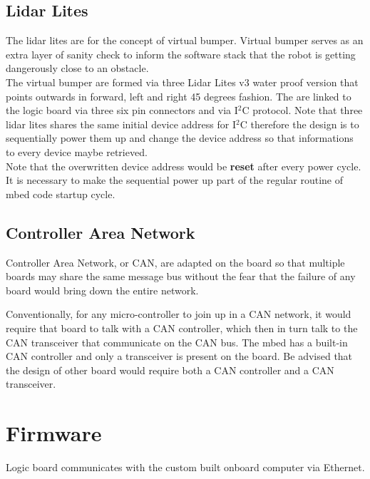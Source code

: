 \documentclass[letterpaper, 12pt]{article}
\begin{document}
\subsection{Lidar Lites}

The lidar lites are for the concept of virtual bumper. Virtual bumper serves as an extra layer of sanity check to inform
the software stack that the robot is getting dangerously close to an obstacle. \\

The virtual bumper are formed via three Lidar Lites v3 water proof version that points outwards in forward, left and right 45 degrees fashion.
The are linked to the logic board via three six pin connectors and via I$^2$C protocol. Note that three lidar lites shares the same initial 
device address for I$^2$C therefore the design is to sequentially power them up and change the device address so that informations to every device
maybe retrieved. \\

Note that the overwritten device address would be \textbf{reset} after every power cycle. It is necessary to make the sequential power up part of the
regular routine of mbed code startup cycle. 

\subsection{Controller Area Network}

Controller Area Network, or CAN, are adapted on the board so that multiple boards may share the same message bus without the fear that the failure
of any board would bring down the entire network. 

Conventionally, for any micro-controller to join up in a CAN network, it would require that board to talk with a CAN controller, which then in turn
talk to the CAN transceiver that communicate on the CAN bus. The mbed has a built-in CAN controller and only a transceiver is present on the board. 
Be advised that the design of other board would require both a CAN controller and a CAN transceiver. 

\pagebreak

\section{Firmware}
Logic board communicates with the custom built onboard computer via Ethernet. 

\end{document}
